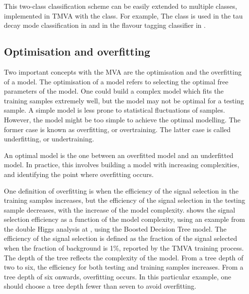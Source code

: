 This two-class classification scheme can  be easily extended to multiple classes, implemented in TMVA with the \multiclass class. For example, The \multiclass class is used in the tau decay mode classification in  and in the flavour tagging classifier in .


\subsection{Optimisation and overfitting}
\label{sec:pandoraMVAoptimisation}

Two important concepts with the MVA are the optimisation and the overfitting of a model. The optimisation of a model refers to selecting the optimal free parameters of the model. One could build a complex model which fits the training samples extremely well, but the model may not be optimal for a testing sample. A simple model is less prone to statistical fluctuations of samples. However, the model might be too simple to achieve the optimal modelling. The former case is known as overfitting, or overtraining. The latter case is called underfitting, or undertraining.


An optimal model is the one between an overfitted model and an underfitted model. In practice, this involves building a model with increasing complexities, and identifying the point where overfitting occurs.

One definition of  overfitting is when the efficiency of the signal selection in the training samples increases, but the efficiency of the signal selection in the testing sample decreases, with the increase of the model complexity.  shows the signal selection efficiency as a function of the model complexity, using an example from the double Higgs analysis at , using the Boosted Decision Tree model. The efficiency of the signal selection is defined as the  fraction of the signal selected when the fraction of background  is 1\%, reported by the TMVA training process. The depth of the tree  reflects the complexity of the model. From a tree depth of two to six, the efficiency for both testing and training samples increases. From a tree depth of six onwards, overfitting occurs. In this particular example, one should choose a tree depth fewer than seven to avoid overfitting.


